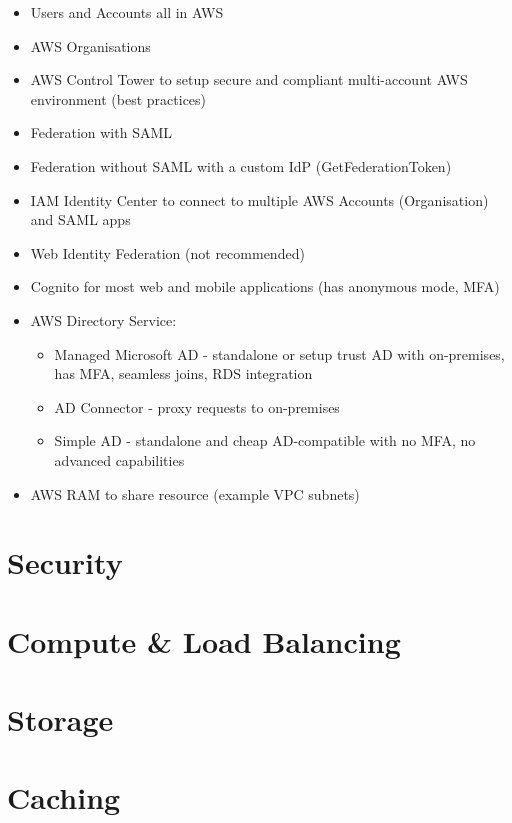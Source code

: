\documentclass[11pt]{book}
\begin{document}
    \begin{itemize}
        \item Users and Accounts all in AWS
        \item AWS Organisations
        \item AWS Control Tower to setup secure and compliant multi-account AWS environment (best practices)
        \item Federation with SAML
        \item Federation without SAML with a custom IdP (GetFederationToken)
        \item IAM Identity Center to connect to multiple AWS Accounts (Organisation) and SAML apps
        \item Web Identity Federation (not recommended)
        \item Cognito for most web and mobile applications (has anonymous mode, MFA)
        \item AWS Directory Service:
        \begin{itemize}
            \item Managed Microsoft AD - standalone or setup trust AD with on-premises, has MFA, seamless joins, RDS integration
            \item AD Connector - proxy requests to on-premises
            \item Simple AD - standalone and cheap AD-compatible with no MFA, no advanced capabilities
        \end{itemize}
        \item AWS RAM to share resource (example VPC subnets)
    \end{itemize}

    \chapter{Security}


    \chapter{Compute \& Load Balancing}


    \chapter{Storage}

    \chapter{Caching}
\end{document}

